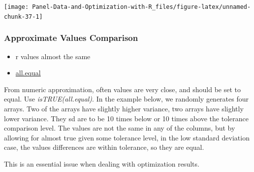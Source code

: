 \documentclass[
]{book}
\providecommand{\tightlist}{%
  \setlength{\itemsep}{0pt}\setlength{\parskip}{0pt}}
\begin{document}
\begin{center}\texttt{[image: Panel-Data-and-Optimization-with-R\_files/figure-latex/unnamed-chunk-37-1]} \end{center}

\hypertarget{approximate-values-comparison}{%
\subsubsection{Approximate Values Comparison}\label{approximate-values-comparison}}

\begin{itemize}
\tightlist
\item
  r values almost the same
\item
  \href{https://stat.ethz.ch/R-manual/R-patched/library/base/html/all.equal.html}{all.equal}
\end{itemize}

From numeric approximation, often values are very close, and should be set to equal. Use \emph{isTRUE(all.equal)}. In the example below, we randomly generates four arrays. Two of the arrays have slightly higher variance, two arrays have slightly lower variance. They sd are to be 10 times below or 10 times above the tolerance comparison level. The values are not the same in any of the columns, but by allowing for almost true given some tolerance level, in the low standard deviation case, the values differences are within tolerance, so they are equal.

This is an essential issue when dealing with optimization results.
\end{document}
